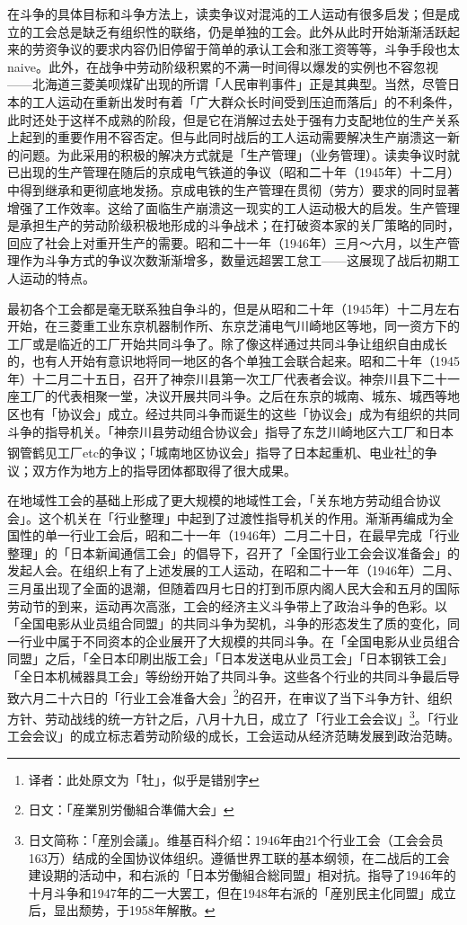 \documentclass[a4paper,12pt]{article}
\newcommand\ja[1]{{\CJKfamily{mincho}#1}}
\begin{document}
在斗争的具体目标和斗争方法上，读卖争议对混沌的工人运动有很多启发；但是成立的工会总是缺乏有组织性的联络，仍是单独的工会。此外从此时开始渐渐活跃起来的劳资争议的要求内容仍旧停留于简单的承认工会和涨工资等等，斗争手段也太naive。此外，在战争中劳动阶级积累的不满一时间得以爆发的实例也不容忽视——北海道三菱美呗煤矿出现的所谓「人民审判事件」正是其典型。当然，尽管日本的工人运动在重新出发时有着「广大群众长时间受到压迫而落后」的不利条件，此时还处于这样不成熟的阶段，但是它在消解过去处于强有力支配地位的生产关系上起到的重要作用不容否定。但与此同时战后的工人运动需要解决生产崩溃这一新的问题。为此采用的积极的解决方式就是「生产管理」（业务管理）。读卖争议时就已出现的生产管理在随后的京成电气铁道的争议（昭和二十年（1945年）十二月）中得到继承和更彻底地发扬。京成电铁的生产管理在贯彻（劳方）要求的同时显著增强了工作效率。这给了面临生产崩溃这一现实的工人运动极大的启发。生产管理是承担生产的劳动阶级积极地形成的斗争战术；在打破资本家的关厂策略的同时，回应了社会上对重开生产的需要。昭和二十一年（1946年）三月～六月，以生产管理作为斗争方式的争议次数渐渐增多，数量远超罢工怠工——这展现了战后初期工人运动的特点。

最初各个工会都是毫无联系独自争斗的，但是从昭和二十年（1945年）十二月左右开始，在三菱重工业东京机器制作所、东京芝浦电气川崎地区等地，同一资方下的工厂或是临近的工厂开始共同斗争了。除了像这样通过共同斗争让组织自由成长的，也有人开始有意识地将同一地区的各个单独工会联合起来。昭和二十年（1945年）十二月二十五日，召开了神奈川县第一次工厂代表者会议。神奈川县下二十一座工厂的代表相聚一堂，决议开展共同斗争。之后在东京的城南、城东、城西等地区也有「协议会」成立。经过共同斗争而诞生的这些「协议会」成为有组织的共同斗争的指导机关。「神奈川县劳动组合协议会」指导了东芝川崎地区六工厂和日本钢管鹤见工厂etc的争议；「城南地区协议会」指导了日本起重机、电业社\footnote{译者：此处原文为「牡」，似乎是错别字}的争议；双方作为地方上的指导团体都取得了很大成果。

在地域性工会的基础上形成了更大规模的地域性工会，「关东地方劳动组合协议会」。这个机关在「行业整理」中起到了过渡性指导机关的作用。渐渐再编成为全国性的单一行业工会后，昭和二十一年（1946年）二月二十日，在最早完成「行业整理」的「日本新闻通信工会」的倡导下，召开了「全国行业工会会议准备会」的发起人会。在组织上有了上述发展的工人运动，在昭和二十一年（1946年）二月、三月虽出现了全面的退潮，但随着四月七日的打到币原内阁人民大会和五月的国际劳动节的到来，运动再次高涨，工会的经济主义斗争带上了政治斗争的色彩。以「全国电影从业员组合同盟」的共同斗争为契机，斗争的形态发生了质的变化，同一行业中属于不同资本的企业展开了大规模的共同斗争。在「全国电影从业员组合同盟」之后，「全日本印刷出版工会」「日本发送电从业员工会」「日本钢铁工会」「全日本机械器具工会」等纷纷开始了共同斗争。这些各个行业的共同斗争最后导致六月二十六日的「行业工会准备大会」\footnote{日文：「\ja{産業別労働組合準備大会}」}的召开，在审议了当下斗争方针、组织方针、劳动战线的统一方针之后，八月十九日，成立了「行业工会会议」\footnote{日文简称：「\ja{産別会議}」。维基百科介绍：1946年由21个行业工会（工会会员163万）结成的全国协议体组织。遵循世界工联的基本纲领，在二战后的工会建设期的活动中，和右派的「\ja{日本労働組合総同盟}」相对抗。指导了1946年的十月斗争和1947年的二一大罢工，但在1948年右派的「\ja{産別民主化同盟}」成立后，显出颓势，于1958年解散。}。「行业工会会议」的成立标志着劳动阶级的成长，工会运动从经济范畴发展到政治范畴。
\end{document}
